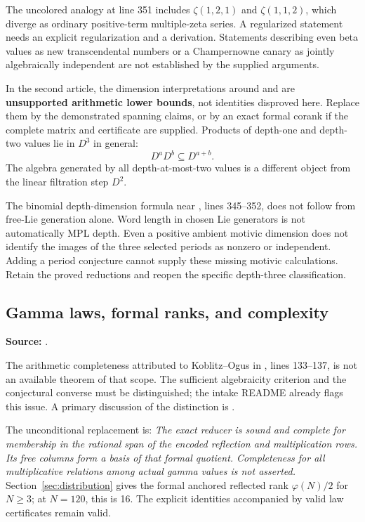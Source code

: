 The uncolored analogy at line 351 includes
\(\zeta(1,2,1)\) and \(\zeta(1,1,2)\), which diverge as ordinary
positive-term multiple-zeta series. A regularized statement needs
an explicit regularization and a derivation.
Statements describing even beta values as new transcendental numbers
or a Champernowne canary as jointly algebraically independent are
not established by the supplied arguments.

In the second article, the dimension interpretations around
 and  are \textbf{unsupported
arithmetic lower bounds}, not identities disproved here.
Replace them by the demonstrated spanning claims, or by an exact
formal corank if the complete matrix and certificate are supplied.
Products of depth-one and depth-two values lie in \(D^3\) in general:
\[
D^aD^b\subseteq D^{a+b}.
\]
The algebra generated by all depth-at-most-two values is a different
object from the linear filtration step \(D^2\).

The binomial depth-dimension formula near ,
lines 345--352, does not follow from free-Lie generation alone.
Word length in chosen Lie generators is not automatically MPL depth.
Even a positive ambient motivic dimension does not identify the
images of the three selected periods as nonzero or independent.
Adding a period conjecture cannot supply these missing motivic
calculations. Retain the proved reductions and reopen the specific
depth-three classification.

\subsection{Gamma laws, formal ranks, and complexity}

\noindent\textbf{Source:}
.

The arithmetic completeness attributed to Koblitz--Ogus in
, lines 133--137, is not an available theorem of that
scope. The sufficient algebraicity criterion and the conjectural
converse must be distinguished; the intake README already flags
this issue. A primary discussion of the distinction is
\cite[\S1.4.2]{ABP}.

The unconditional replacement is:
\emph{The exact reducer is sound and complete for membership in the
rational span of the encoded reflection and multiplication rows.
Its free columns form a basis of that formal quotient.
Completeness for all multiplicative relations among actual gamma
values is not asserted.}
Section~\ref{sec:distribution} gives the formal anchored reflected
rank \(\varphi(N)/2\) for \(N\ge3\); at \(N=120\), this is 16.
The explicit identities accompanied by valid law certificates remain
valid.

